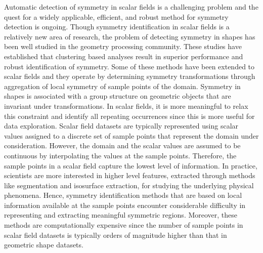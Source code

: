 \documentclass[review,journal]{vgtc}         %
\begin{document}
Automatic detection of symmetry in scalar fields is a challenging problem and 
the quest for a widely applicable, efficient, and robust method for symmetry 
detection is ongoing. Though symmetry identification in scalar
fields is a relatively new area of research, the problem of detecting symmetry
in shapes has been well studied in the geometry processing community.
These studies have established that clustering based analyses result in superior
performance and robust identification of symmetry. Some of these methods
have been extended to scalar fields and they operate by determining symmetry
transformations through aggregation of local symmetry of sample points of the
domain. {\color{blue}Symmetry in shapes is associated with a group structure on
geometric objects that are invariant under transformations. In scalar fields, it is more
meaningful to relax this constraint and identify all repeating occurrences since this is
more useful for data exploration.} Scalar field datasets are typically represented using scalar values 
assigned to a discrete set of sample points that represent the domain under 
consideration. However, the domain and the scalar values are assumed to be continuous by
interpolating the values at the sample points. Therefore, the sample points in a scalar 
field capture the lowest level of information. In practice, scientists are more interested
in higher level features, extracted through methods like segmentation and isosurface extraction,
for studying the underlying physical phenomena. Hence, symmetry identification methods that are based on 
local information available at the sample points encounter considerable difficulty in representing 
and extracting meaningful symmetric regions. Moreover, these methods are computationally 
expensive since the number of sample points in scalar field datasets is typically orders of magnitude
higher than that in geometric shape datasets.
\end{document}

